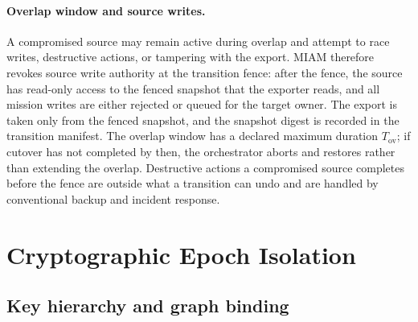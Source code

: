 \documentclass[11pt,letterpaper]{article}
\begin{document}
\paragraph{Overlap window and source writes.} A compromised source may remain active during overlap and attempt to race writes, destructive actions, or tampering with the export. MIAM therefore revokes source write authority at the transition fence: after the fence, the source has read-only access to the fenced snapshot that the exporter reads, and all mission writes are either rejected or queued for the target owner. The export is taken only from the fenced snapshot, and the snapshot digest is recorded in the transition manifest. The overlap window has a declared maximum duration $T_{\mathrm{ov}}$; if cutover has not completed by then, the orchestrator aborts and restores rather than extending the overlap. Destructive actions a compromised source completes before the fence are outside what a transition can undo and are handled by conventional backup and incident response.

\section{Cryptographic Epoch Isolation}

\subsection{Key hierarchy and graph binding}
\end{document}
